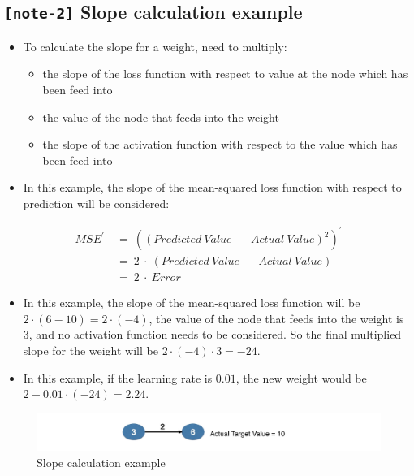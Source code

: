 \documentclass[11pt, twoside]{article}
\begin{document}
    \hypertarget{note-2-slope-calculation-example}{%
\subsection{\texorpdfstring{\texttt{{[}note-2{]}} Slope calculation
example}{{[}note-2{]} Slope calculation example}}\label{note-2-slope-calculation-example}}

\begin{itemize}
\item
  To calculate the slope for a weight, need to multiply:

  \begin{itemize}
  \item
    the slope of the loss function with respect to value at the node
    which has been feed into
  \item
    the value of the node that feeds into the weight
  \item
    the slope of the activation function with respect to the value which
    has been feed into
  \end{itemize}
\item
  In this example, the slope of the mean-squared loss function with
  respect to prediction will be considered:
\end{itemize}

\begin{equation*}
    \begin{aligned}
        {MSE}^{\prime}\ &=\ \left({\left(Predicted\ Value\ -\ Actual\ Value\right)}^{2}\right)^{\prime}\\
        &=\ 2\ \cdot\ \left(Predicted\ Value\ -\ Actual\ Value\right)\\
        &=\ 2\ \cdot\ Error
    \end{aligned}
\end{equation*}

\begin{itemize}
\item
  In this example, the slope of the mean-squared loss function will be
  \(2 \cdot (6 - 10) = 2 \cdot (-4)\), the value of the node that feeds
  into the weight is \(3\), and no activation function needs to be
  considered. So the final multiplied slope for the weight will be
  \(2 \cdot (-4) \cdot 3 = -24\).
\item
  In this example, if the learning rate is \(0.01\), the new weight
  would be \(2 - 0.01 \cdot (-24) = 2.24\).
\end{itemize}

\begin{figure}
\centering
\includegraphics{../Figures/8. Slope calculation example.jpg}
\caption{Slope calculation example}
\end{figure}
\end{document}
